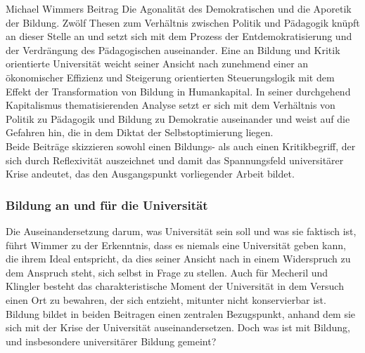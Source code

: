 Michael Wimmers Beitrag \glqq Die Agonalität des
Demokratischen und die Aporetik der Bildung. Zwölf Thesen zum Verhältnis
zwischen Politik und Pädagogik\grqq\footnotemark {} knüpft an dieser Stelle an und setzt sich mit
dem Prozess der Entdemokratisierung und
der Verdrängung des Pädagogischen\footnotemark {} auseinander. Eine an Bildung und Kritik
orientierte Universität weicht seiner Ansicht nach zunehmend \glqq einer an
ökonomischer Effizienz und Steigerung orientierten Steuerungslogik\grqq\footnotemark {} mit dem
Effekt der Transformation von Bildung in Humankapital. In seiner durchgehend
Kapitalismus thematisierenden Analyse setzt er sich mit dem Verhältnis von
Politik zu Pädagogik und Bildung zu Demokratie auseinander und weist auf die
Gefahren hin, die in dem Diktat der Selbstoptimierung liegen.\\

\noindent Beide Beiträge skizzieren sowohl einen Bildungs- als auch einen Kritikbegriff, der sich durch
Reflexivität auszeichnet und damit das Spannungsfeld universitärer Krise
andeutet, das den Ausgangspunkt vorliegender Arbeit bildet. 

\subsubsection{Bildung an und für die Universität}

Die Auseinandersetzung darum, was Universität sein soll und was sie faktisch
ist, führt Wimmer zu der Erkenntnis, dass es niemals eine Universität geben
kann, die ihrem Ideal entspricht, da dies seiner Ansicht nach in einem
Widerspruch zu dem Anspruch steht, sich selbst in Frage zu
stellen.\footnotemark {} Auch für
Mecheril und Klingler besteht das charakteristische Moment der Universität in
dem Versuch einen Ort zu bewahren, \glqq der sich entzieht, mitunter nicht
konservierbar ist.\grqq\footnotemark {} Bildung bildet in beiden Beitragen einen zentralen
Bezugspunkt, anhand dem sie sich mit der Krise der Universität
auseinandersetzen. Doch was ist mit Bildung, und insbesondere universitärer
Bildung gemeint? \\

